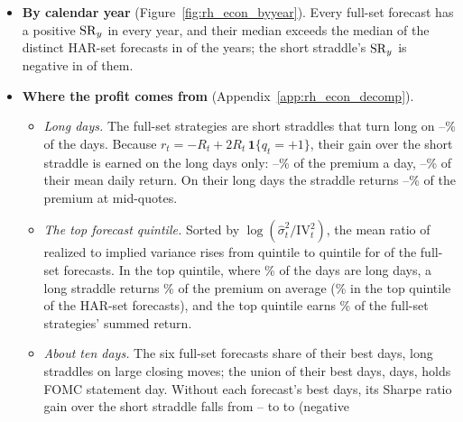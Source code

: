 \begin{itemize}
  \rhrAfPoolDShMin{} to \rhrAfPoolDShMax, and the gain is significant at the 5\% level for \rhemFullVsHarSigWord{} of
  the six (Ledoit--Wolf test). For the three linear classes the comparator is the benchmark forecast itself; their
  gains, \rhemDShRidgeFullVsHar,
  \rhemDShLassoFullVsHar{} and \rhemDShEnetFullVsHar{} for the ridge, lasso and elastic net, have Ledoit--Wolf
  $p$-values of \rhemPDShRidgeFullVsHar, \rhemPDShLassoFullVsHar{} and \rhemPDShEnetFullVsHar.
\item \textbf{By calendar year} (Figure~\ref{fig:rh_econ_byyear}). Every full-set forecast has a positive $\mathrm{SR}_y$ in
  every year, and their median exceeds the median of the \rhemHarDistinctWord{} distinct HAR-set forecasts in
  \rhemYearsFullMedAboveHarMedWord{} of the \rhemNYearsWord{} years; the short straddle's $\mathrm{SR}_y$ is negative in
  \rhemYearsShortNegWord{} of them.
\item \textbf{Where the profit comes from} (Appendix~\ref{app:rh_econ_decomp}).
  \begin{itemize}
  \item \emph{Long days.} The full-set strategies are short straddles that turn long on \rhedLongPctMin--\rhedLongPctMax\%
    of the days. Because $r_t = -R_t + 2R_t\,\mathbf{1}\{q_t = +1\}$, their gain over the short straddle is earned on
    the long days only: \rhedGainMin--\rhedGainMax\% of the premium a day, \rhedGainShareMin--\rhedGainShareMax\% of
    their mean daily return. On their long days the straddle returns \rhedLongMidMin--\rhedLongMidMax\% of the
    premium at mid-quotes.
  \item \emph{The top forecast quintile.} Sorted by $\log(\hat\sigma^2_t/\mathrm{IV}_t^2)$, the mean ratio of realized
    to implied variance rises from quintile to quintile for \rhedQMonoN{} of the \rhedNFull{} full-set forecasts. In the top
    quintile, where \rhedQFiveLong\% of the days are long days, a long straddle returns \rhedQFiveR\% of the premium on
    average (\rhedHarQFiveR\% in the top quintile of the HAR-set forecasts), and the top quintile earns
    \rhedQFiveShare\% of the full-set strategies' summed return.
  \item \emph{About ten days.} The six full-set forecasts share \rhedBestAllSix{} of their \rhedNTop{} best days, long
    straddles on large closing moves; the union of their best days, \rhedBestUnion{} days, holds \rhedBestFomcN{}
    FOMC statement day. Without each forecast's \rhedNTop{} best days, its Sharpe ratio gain over the short straddle
    falls from \rhedDShortAllMin--\rhedDShortAllMax{} to \rhedDShortExBestMin{} to \rhedDShortExBestMax{} (negative

\end{itemize}
\end{itemize}
